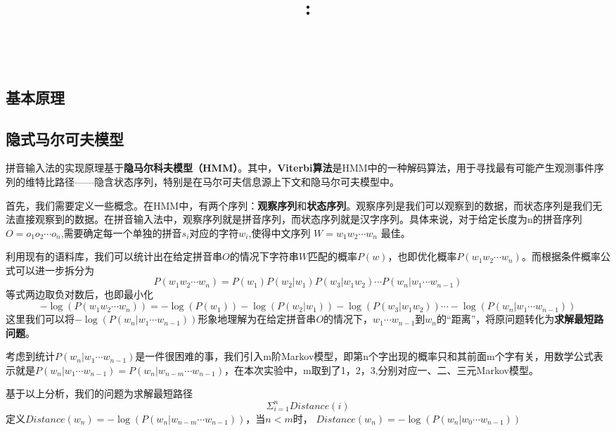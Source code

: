 \documentclass{article}
\title{\textmd{\bf \Class: \Title}}
\author{\textbf{\StudentName}\ \ \StudentClass\ \ \StudentNumber}
\begin{document}
\begin{spacing}{1.1}
\maketitle \thispagestyle{empty}
\section{基本原理}
	\subsection{隐式马尔可夫模型}
	\hspace{1.4em} 拼音输入法的实现原理基于\textbf{隐马尔科夫模型（HMM）}。其中，\textbf{Viterbi算法}是HMM中的一种解码算法，用于寻找最有可能产生观测事件序列的维特比路径——隐含状态序列，特别是在马尔可夫信息源上下文和隐马尔可夫模型中。
	
	首先，我们需要定义一些概念。在HMM中，有两个序列：\textbf{观察序列}和\textbf{状态序列}。观察序列是我们可以观察到的数据，而状态序列是我们无法直接观察到的数据。在拼音输入法中，观察序列就是拼音序列，而状态序列就是汉字序列。具体来说，对于给定长度为n的拼音序列$O=o_1o_2\cdots o_n$,需要确定每一个单独的拼音$s_i$对应的字符$w_i$,使得中文序列 $W=w_1w_2\cdots w_n$ 最佳。
	
	利用现有的语料库，我们可以统计出在给定拼音串$O$的情况下字符串$W$匹配的概率$P(w)$，也即优化概率$P(w_1w_2\cdots w_n)$。而根据条件概率公式可以进一步拆分为$$P(w_1w_2\cdots w_n) = P(w_1)P(w_2|w_1)P(w_3|w_1w_2)\cdots P(w_n|w_1\cdots w_{n-1})$$
	\hspace{1.4em}
	等式两边取负对数后，也即最小化$$-\log(P(w_1w_2\cdots w_n)) = -\log(P(w_1))-\log(P(w_2|w_1))-\log(P(w_3|w_1w_2))\cdots -\log(P(w_n|w_1\cdots w_{n-1}))$$
	\hspace{1.4em}
	这里我们可以将$-\log(P(w_n|w_1\cdots w_{n-1}))$形象地理解为在给定拼音串$O$的情况下，$w_1\cdots w_{n-1}$到$w_n$的“距离”，将原问题转化为\textbf{求解最短路问题}。
	
	考虑到统计$P(w_n|w_1\cdots w_{n-1})$是一件很困难的事，我们引入m阶Markov模型，即第n个字出现的概率只和其前面m个字有关，用数学公式表示就是$P(w_n|w_1\cdots w_{n-1}) =P(w_n|w_{n-m}\cdots w_{n-1})$，在本次实验中，m取到了1，2，3,分别对应一、二、三元Markov模型。
	
	基于以上分析，我们的问题为求解最短路径
	$$\Sigma_{i=1}^nDistance(i)$$  
	\hspace{1.4em}
	定义$ Distance(w_n)=-\log(P(w_n|w_{n-m}\cdots w_{n-1}))$，当$n<m$时， $Distance(w_n)=-\log(P(w_n|w_0\cdots w_{n-1}))$
	

\end{spacing}
\end{document}
